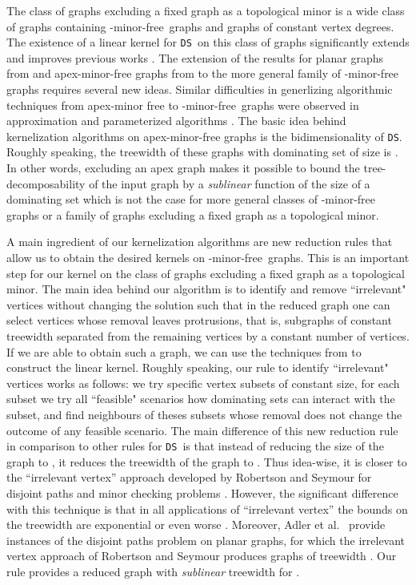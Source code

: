 \documentclass[11pt]{article}
\newcommand{\Hmf}{-minor-free}
\newcommand{\tDS}{{\texttt{\sc DS}}}
\begin{document}
  The class of graphs excluding a fixed graph  as a topological minor  is a wide class of graphs containing \Hmf\, graphs and graphs of constant vertex degrees. The existence of a linear kernel for \tDS \, on this class of graphs significantly extends and improves  previous works  
  \cite{AG08TechReport,F.V.Fomin:2012,Gutner09}.
The extension of the results for planar graphs from \cite{AlberFN04} and apex-minor-free graphs from \cite{F.V.Fomin:2010oq} to the more general family of  \Hmf \, graphs requires several new ideas. Similar difficulties in 
  generlizing algorithmic techniques from apex-minor free to \Hmf \, graphs were observed in approximation   
\cite{Demaine:2009pd}  and parameterized algorithms  \cite{DemaineFHT05sub,DraganFG08}.  The basic idea behind kernelization algorithms on  apex-minor-free  graphs is the bidimensionality of \tDS. Roughly speaking, the treewidth of these graphs with dominating set of size  is  .  In other words, 
excluding an apex graph 
makes it possible to bound the tree-decomposability  of the input 
graph by a {\em sublinear} function of the size of a dominating set which is not the case for more general classes of \Hmf \, graphs or a family of graphs excluding a fixed graph  as a topological minor. 
  
  
A main ingredient of our kernelization algorithms are new reduction rules that allow us to obtain the desired kernels on \Hmf \, graphs.  This is an important step for our kernel on  the class of graphs excluding a fixed graph  as a topological minor.   The main idea behind our algorithm is to identify and remove ``irrelevant" vertices  without changing the solution such that in the reduced graph one can select  vertices whose removal leaves protrusions, that is, subgraphs of constant treewidth separated from the remaining vertices by a constant number of vertices. If we are  able to 
obtain such a graph, we can use   the techniques from \cite{F.V.Fomin:2010oq} to construct the linear kernel. 
Roughly speaking, our rule to  identify  ``irrelevant"  vertices works as follows: 
we try specific vertex subsets of constant size, for each subset we try all ``feasible" scenarios how dominating sets can  interact with the subset, and find neighbours of theses 
subsets whose removal does not change the outcome of any feasible scenario. 
The main difference of this new reduction  rule in comparison to other rules for  \tDS \,   \cite{AlberFN04,ChenFKX07} is that instead of  reducing the size of the graph to , it reduces the treewidth of the graph to  . Thus idea-wise, it is closer  to 
 the ``irrelevant vertex'' approach  developed  by Robertson and Seymour  for 
  disjoint paths  and minor checking problems \cite{RobertsonS-XIII}. 
However, the significant difference with this technique is that in all applications of ``irrelevant vertex''   the bounds on the treewidth are exponential or even worse
\cite{KawarabayashiK08,Kawarabayashi:2010cs,Kobayashi:2009jt}. Moreover,  Adler et al.~\cite{Adler11} provide instances  of the  disjoint paths problem on planar graphs, for which the irrelevant vertex approach of  Robertson and Seymour produces graphs of treewidth .  Our rule provides a reduced graph with   \emph{sublinear}    treewidth for .
\end{document}
